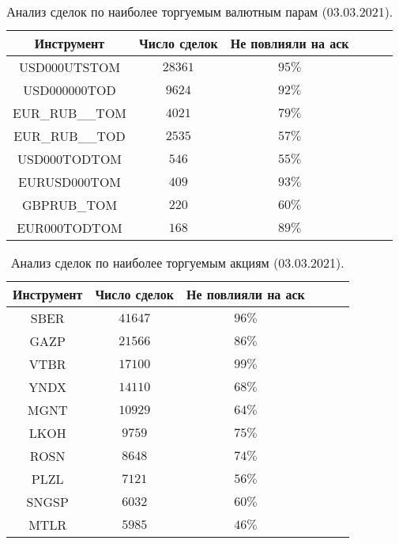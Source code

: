 \begin{table}[h!]
    \begin{center}
        \begin{tabular}{|c|c|c|c|c|c|}
            \hline
        Инструмент        & Число сделок & Не повлияли на аск  %
        \\ \hline
        USD000UTSTOM    & $28361$ &    $95\%$ %
        \\ \hline
        USD000000TOD    & $9624$ &     $92\%$ %
        \\ \hline
        EUR\_RUB\_\_TOM & $4021$ &  $79\%$ %
        \\ \hline
        EUR\_RUB\_\_TOD & $2535$ &  $57\%$ %
        \\ \hline
        USD000TODTOM    & $546$ &      $55\%$ %
        \\ \hline
        EURUSD000TOM    & $409$ &      $93\%$ %
        \\ \hline
        GBPRUB\_TOM     & $220$ &       $60\%$ %
        \\ \hline
        EUR000TODTOM    & $168$ &      $89\%$ %
          \\ \hline
        \end{tabular}
    \end{center}
    \label{tableanalCUnew}
    \caption{Анализ сделок по наиболее торгуемым валютным парам (03.03.2021).}
\end{table} 

\begin{table}[h!]
    \begin{center}
        \begin{tabular}{|c|c|c|c|c|c|}
            \hline
        Инструмент   & Число сделок & Не повлияли на аск %
        \\ \hline
        SBER &  $41647$  & $ 96\% $ %
        \\ \hline
        GAZP &  $21566$  & $ 86\% $ %
        \\ \hline
        VTBR &  $17100$  & $ 99\% $ %
         \\ \hline
        YNDX &  $14110$  & $ 68\% $ %
        \\ \hline
        MGNT &  $10929$  & $ 64\% $ %
        \\ \hline
        LKOH &  $9759 $ &  $ 75\% $ %
        \\ \hline
        ROSN &  $8648 $ &  $ 74\% $ %
         \\ \hline
        PLZL &  $7121 $ &  $ 56\% $ %
        \\ \hline
        SNGSP & $ 6032$  & $ 60\% $ %
        \\ \hline
        MTLR &  $5985 $ &  $ 46\% $ %
        \\ \hline
        \end{tabular}
    \end{center}
    \label{tableanalSE}
    \caption{Анализ сделок по наиболее торгуемым акциям (03.03.2021).}
\end{table} 